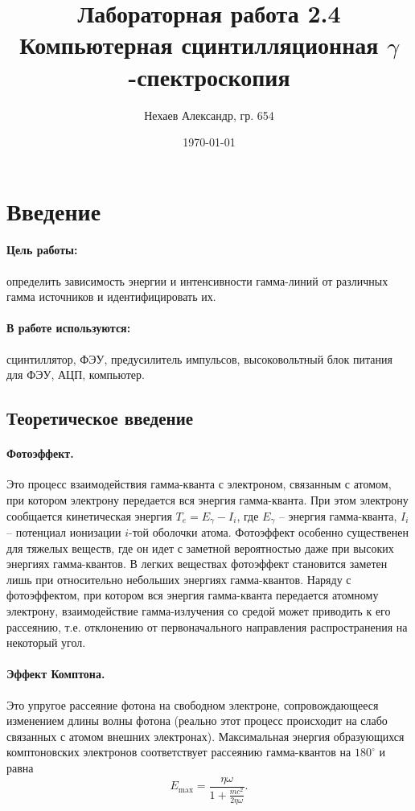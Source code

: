 \documentclass[a4paper, 12pt]{article}
\title{Лабораторная работа 2.4\\Компьютерная сцинтилляционная $\gamma$-спектроскопия}
\author{Нехаев Александр, гр. 654}
\date{\today}
\begin{document}
	\maketitle
	\tableofcontents
	\section{Введение}
	\paragraph{Цель работы:}
	определить зависимость энергии и интенсивности гамма-линий от различных гамма источников и идентифицировать их.
	\paragraph{В работе используются:}
	сцинтиллятор, ФЭУ, предусилитель импульсов, высоковольтный блок питания для ФЭУ, АЦП, компьютер.
	\subsection{Теоретическое введение}
	\paragraph{Фотоэффект.}
	Это процесс взаимодействия гамма-кванта с электроном, связанным с атомом, при котором электрону передается вся энергия гамма-кванта. При этом электрону сообщается кинетическая энергия $T_e=E_\gamma-I_i$, где $E_\gamma$ -- энергия гамма-кванта, $I_i$ -- потенциал ионизации $i$-той оболочки атома. Фотоэффект особенно существенен для тяжелых веществ, где он идет с заметной вероятностью даже при высоких энергиях гамма-квантов. В легких веществах фотоэффект становится заметен лишь при относительно небольших энергиях гамма-квантов. Наряду с фотоэффектом, при котором вся энергия гамма-кванта передается атомному электрону, взаимодействие гамма-излучения со средой может приводить к его рассеянию, т.е. отклонению от первоначального направления распространения на некоторый угол.
	\paragraph{Эффект Комптона.} Это упругое рассеяние фотона на свободном электроне, сопровождающееся изменением длины волны фотона (реально этот процесс происходит на слабо связанных с атомом внешних электронах). Максимальная энергия образующихся комптоновских электронов соответствует рассеянию гамма-квантов на $180^\circ$ и равна
	\begin{equation}
		E_{\max}=\frac{\eta\omega}{1+\frac{mc^2}{2\eta\omega}}.
	\end{equation}
\end{document}
